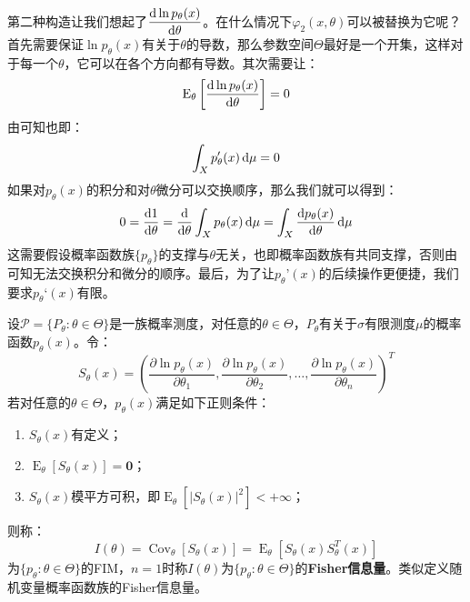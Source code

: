 \begin{note}
	第二种构造让我们想起了$\dfrac{\mathop{}\!\mathrm{d}\ln p_{\theta}(x)}{\mathop{}\!\mathrm{d}\theta}$。在什么情况下$\varphi_2(x,\theta)$可以被替换为它呢？首先需要保证$\ln p_{\theta}(x)$有关于$\theta$的导数，那么参数空间$\Theta$最好是一个开集，这样对于每一个$\theta$，它可以在各个方向都有导数。其次需要让：
	\begin{equation*}
		\operatorname{E}_{\theta}\left[\frac{\mathop{}\!\mathrm{d}\ln p_{\theta}(x)}{\mathop{}\!\mathrm{d}\theta}\right]=0
	\end{equation*}
	由可知也即：
	\begin{equation*}
		\int_{X}p_{\theta}'(x)\mathop{}\!\mathrm{d}\mu=0
	\end{equation*}
	如果对$p_{\theta}(x)$的积分和对$\theta$微分可以交换顺序，那么我们就可以得到：
	\begin{equation*}
		0=\frac{\dif1}{\dif\theta}=\frac{\dif}{\dif\theta}\int_{X}p_{\theta}(x)\dif\mu=\int_{X}\frac{\dif p_{\theta}(x)}{\dif\theta}\dif\mu
	\end{equation*}
	这需要假设概率函数族$\{p_{\theta}\}$的支撑与$\theta$无关，也即概率函数族有共同支撑，否则由可知无法交换积分和微分的顺序。最后，为了让$p_{\theta}’(x)$的后续操作更便捷，我们要求$p_{\theta}‘(x)$有限。
\end{note}
\begin{definition}
	设$\mathscr{P}=\{P_{\theta}:\theta\in\Theta\}$是一族概率测度，对任意的$\theta\in\Theta$，$P_{\theta}$有关于$\sigma$有限测度$\mu$的概率函数$p_{\theta}(x)$。令：
	\begin{equation*}
		S_{\theta}(x)=\left(\frac{\partial\ln p_{\theta}(x)}{\partial\theta_1},\frac{\partial\ln p_{\theta}(x)}{\partial\theta_2},\dots,\frac{\partial\ln p_{\theta}(x)}{\partial\theta_n}\right)^T
	\end{equation*}
	若对任意的$\theta\in\Theta$，$p_{\theta}(x)$满足如下正则条件：
	\begin{enumerate}
		\item $S_{\theta}(x)$有定义；
		\item $\operatorname{E}_{\theta}[S_{\theta}(x)]=\mathbf{0}$；
		\item $S_{\theta}(x)$模平方可积，即$\operatorname{E}_{\theta}[|S_{\theta}(x)|^2]<+\infty$；
	\end{enumerate}
	则称：
	\begin{equation*}
		I(\theta)=\operatorname{Cov}_{\theta}[S_{\theta}(x)]=\operatorname{E}_{\theta}[S_{\theta}(x)S_{\theta}^T(x)]
	\end{equation*}
	为$\{p_{\theta}:\theta\in\Theta\}$的\gls{FIM}，$n=1$时称$I(\theta)$为$\{p_{\theta}:\theta\in\Theta\}$的\textbf{Fisher信息量}。类似定义随机变量概率函数族的Fisher信息量。
\end{definition}

